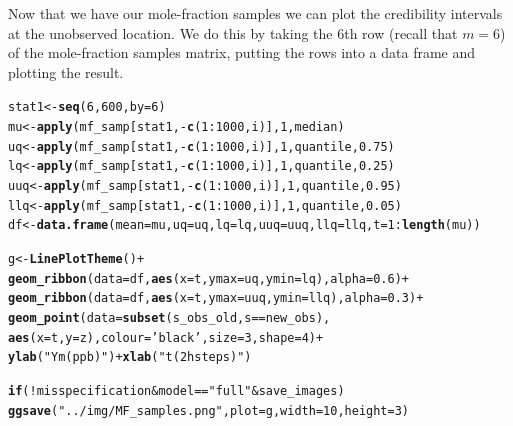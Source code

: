 \documentclass[a4paper,11pt]{article}\usepackage[]{graphicx}\usepackage[]{color}
\makeatletter
\newcommand{\hlnum}[1]{\textcolor[rgb]{0.686,0.059,0.569}{#1}}%
\newcommand{\hlstr}[1]{\textcolor[rgb]{0.192,0.494,0.8}{#1}}%
\newcommand{\hlopt}[1]{\textcolor[rgb]{0,0,0}{#1}}%
\newcommand{\hlstd}[1]{\textcolor[rgb]{0.345,0.345,0.345}{#1}}%
\newcommand{\hlkwa}[1]{\textcolor[rgb]{0.161,0.373,0.58}{\textbf{#1}}}%
\newcommand{\hlkwb}[1]{\textcolor[rgb]{0.69,0.353,0.396}{#1}}%
\newcommand{\hlkwc}[1]{\textcolor[rgb]{0.333,0.667,0.333}{#1}}%
\newcommand{\hlkwd}[1]{\textcolor[rgb]{0.737,0.353,0.396}{\textbf{#1}}}%
\newenvironment{kframe}{%
 \def\at@end@of@kframe{}%
 \ifinner\ifhmode%
  \def\at@end@of@kframe{\end{minipage}}%
  \begin{minipage}{\columnwidth}%
 \fi\fi%
 \def\FrameCommand##1{\hskip\@totalleftmargin \hskip-\fboxsep
 \colorbox{shadecolor}{##1}\hskip-\fboxsep
     \hskip-\linewidth \hskip-\@totalleftmargin \hskip\columnwidth}%
 \MakeFramed {\advance\hsize-\width
   \@totalleftmargin\z@ \linewidth\hsize
   \@setminipage}}%
 {\par\unskip\endMakeFramed%
 \at@end@of@kframe}
\newenvironment{knitrout}{}{} %
\makeatother
\begin{document}
Now that we have our mole-fraction samples we can plot the credibility intervals at the unobserved location. We do this by taking the 6th row (recall that $m = 6$) of the mole-fraction samples matrix, putting the rows into a data frame and plotting the result.
\begin{knitrout}
\color{fgcolor}\begin{kframe}
\begin{alltt}
\hlstd{stat1} \hlkwb{<-}  \hlkwd{seq}\hlstd{(}\hlnum{6}\hlstd{,}\hlnum{600}\hlstd{,}\hlkwc{by}\hlstd{=}\hlnum{6}\hlstd{)}
\hlstd{mu} \hlkwb{<-} \hlkwd{apply}\hlstd{(mf_samp[stat1,}\hlopt{-}\hlkwd{c}\hlstd{(}\hlnum{1}\hlopt{:}\hlnum{1000}\hlstd{,i)],}\hlnum{1}\hlstd{,median)}
\hlstd{uq} \hlkwb{<-} \hlkwd{apply}\hlstd{(mf_samp[stat1,}\hlopt{-}\hlkwd{c}\hlstd{(}\hlnum{1}\hlopt{:}\hlnum{1000}\hlstd{,i)],}\hlnum{1}\hlstd{,quantile,}\hlnum{0.75}\hlstd{)}
\hlstd{lq} \hlkwb{<-} \hlkwd{apply}\hlstd{(mf_samp[stat1,}\hlopt{-}\hlkwd{c}\hlstd{(}\hlnum{1}\hlopt{:}\hlnum{1000}\hlstd{,i)],}\hlnum{1}\hlstd{,quantile,}\hlnum{0.25}\hlstd{)}
\hlstd{uuq} \hlkwb{<-} \hlkwd{apply}\hlstd{(mf_samp[stat1,}\hlopt{-}\hlkwd{c}\hlstd{(}\hlnum{1}\hlopt{:}\hlnum{1000}\hlstd{,i)],}\hlnum{1}\hlstd{,quantile,}\hlnum{0.95}\hlstd{)}
\hlstd{llq} \hlkwb{<-} \hlkwd{apply}\hlstd{(mf_samp[stat1,}\hlopt{-}\hlkwd{c}\hlstd{(}\hlnum{1}\hlopt{:}\hlnum{1000}\hlstd{,i)],}\hlnum{1}\hlstd{,quantile,}\hlnum{0.05}\hlstd{)}
\hlstd{df} \hlkwb{<-} \hlkwd{data.frame}\hlstd{(}\hlkwc{mean} \hlstd{= mu,} \hlkwc{uq}\hlstd{=uq,}\hlkwc{lq}\hlstd{=lq,}\hlkwc{uuq}\hlstd{=uuq,}\hlkwc{llq}\hlstd{=llq,}\hlkwc{t}\hlstd{=}\hlnum{1}\hlopt{:}\hlkwd{length}\hlstd{(mu))}

\hlstd{g} \hlkwb{<-} \hlkwd{LinePlotTheme}\hlstd{()} \hlopt{+}
  \hlkwd{geom_ribbon}\hlstd{(}\hlkwc{data}\hlstd{=df,}\hlkwd{aes}\hlstd{(}\hlkwc{x}\hlstd{=t,}\hlkwc{ymax}\hlstd{=uq,}\hlkwc{ymin}\hlstd{=lq),}\hlkwc{alpha}\hlstd{=}\hlnum{0.6}\hlstd{)} \hlopt{+}
  \hlkwd{geom_ribbon}\hlstd{(}\hlkwc{data}\hlstd{=df,}\hlkwd{aes}\hlstd{(}\hlkwc{x}\hlstd{=t,}\hlkwc{ymax}\hlstd{=uuq,}\hlkwc{ymin}\hlstd{=llq),}\hlkwc{alpha}\hlstd{=}\hlnum{0.3}\hlstd{)} \hlopt{+}
  \hlkwd{geom_point}\hlstd{(}\hlkwc{data}\hlstd{=}\hlkwd{subset}\hlstd{(s_obs_old,s}\hlopt{==}\hlstd{new_obs),}
             \hlkwd{aes}\hlstd{(}\hlkwc{x}\hlstd{=t,}\hlkwc{y} \hlstd{= z),}\hlkwc{colour}\hlstd{=}\hlstr{'black'}\hlstd{,}\hlkwc{size}\hlstd{=}\hlnum{3}\hlstd{,}\hlkwc{shape}\hlstd{=}\hlnum{4}\hlstd{)}\hlopt{+}
    \hlkwd{ylab}\hlstd{(}\hlstr{"Ym (ppb)"}\hlstd{)} \hlopt{+} \hlkwd{xlab}\hlstd{(}\hlstr{"t (2 h steps)"}\hlstd{)}

\hlkwa{if}\hlstd{(}\hlopt{!}\hlstd{misspecification} \hlopt{&} \hlstd{model}\hlopt{==}\hlstr{"full"} \hlopt{&} \hlstd{save_images)}
  \hlkwd{ggsave}\hlstd{(}\hlstr{"../img/MF_samples.png"}\hlstd{,}\hlkwc{plot} \hlstd{= g,}\hlkwc{width}\hlstd{=}\hlnum{10}\hlstd{,}\hlkwc{height}\hlstd{=}\hlnum{3}\hlstd{)}
\end{alltt}
\end{kframe}
\end{knitrout}
\end{document}
